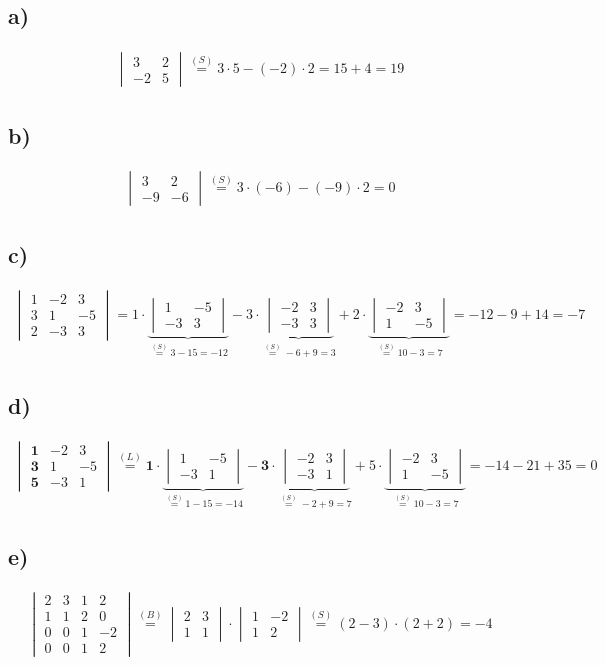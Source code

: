 \documentclass[titlepage]{article}
\newcommand{\1}{\mathbb{1}}
\newcommand{\0}{\mathbb{0}}
\newcommand{\detZ}[4]{\begin{vmatrix}#1&#2\\#3&#4\end{vmatrix}}
\newcommand{\detD}[9]{\begin{vmatrix}#1&#2&#3\\#4&#5&#6\\#7&#8&#9\end{vmatrix}}
\begin{document}
		\subsection*{a)}
		\begin{align*}
			\detZ{3}{2}{-2}{5}\overset{(S)}{=}3\cdot5-(-2)\cdot2=15+4=19
		\end{align*}
		\subsection*{b)}
		\begin{align*}
			\detZ{3}{2}{-9}{-6}\overset{(S)}{=}3\cdot(-6)-(-9)\cdot2=0
		\end{align*}
		\subsection*{c)}
		\begin{align*}
			\detD{1}{-2}{3}{3}{1}{-5}{2}{-3}{3}=1\cdot\underbrace{\detZ{1}{-5}{-3}{3}}_{\overset{(S)}{=}3-15=-12}-3\cdot\underbrace{\detZ{-2}{3}{-3}{3}}_{\overset{(S)}{=}-6+9=3}+2\cdot\underbrace{\detZ{-2}{3}{1}{-5}}_{\overset{(S)}{=}10-3=7}=-12-9+14=-7
		\end{align*}
		\subsection*{d)}
		\begin{align*}
			\detD{\textbf{1}}{-2}{3}{\textbf{3}}{1}{-5}{\textbf{5}}{-3}{1}\overset{(L)}{=}\textbf{1}\cdot\underbrace{\detZ{1}{-5}{-3}{1}}_{\overset{(S)}{=}1-15=-14}-\textbf{3}\cdot\underbrace{\detZ{-2}{3}{-3}{1}}_{\overset{(S)}{=}-2+9=7}+5\cdot\underbrace{\detZ{-2}{3}{1}{-5}}_{\overset{(S)}{=}10-3=7}=-14-21+35=0
		\end{align*}
		\subsection*{e)}
		\begin{align*}
			\begin{vmatrix}
				2&3&1&2\\
				1&1&2&0\\
				0&0&1&-2\\
				0&0&1&2
			\end{vmatrix}
			\overset{(B)}{=}\detZ{2}{3}{1}{1}\cdot\detZ{1}{-2}{1}{2}\overset{(S)}{=}(2-3)\cdot(2+2)=-4
		\end{align*}
\end{document}
